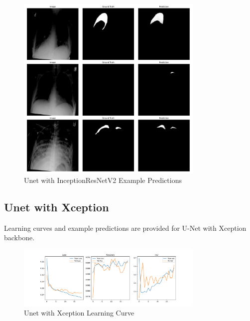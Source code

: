 \documentclass{article}
\begin{document}
\begin{figure}[H]
    \centering
    \includegraphics[width=0.8\textwidth]{plots/uincp.pdf}
    \caption{Unet with InceptionResNetV2 Example Predictions}
    \label{fig:unet_inception_resnetv2_p}
\end{figure}

\subsection*{Unet with Xception}
Learning curves and example predictions are provided for U-Net with Xception backbone.

\begin{figure}[H]
    \centering
    \includegraphics[width=0.8\textwidth]{plots/uxp.pdf}
    \caption{Unet with Xception Learning Curve}
    \label{fig:unet_xception}
\end{figure}
\end{document}
